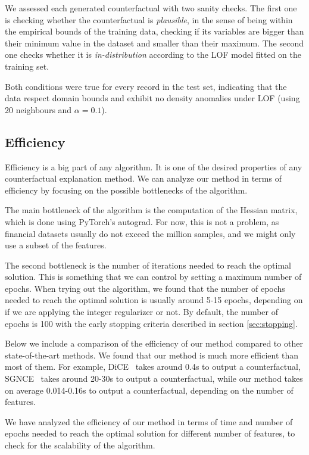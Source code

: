 \documentclass[12pt]{extarticle}
\numberwithin{equation}{section}
\begin{document}
We assessed each generated counterfactual with two sanity checks. The first one is checking whether the counterfactual is \emph{plausible}, in the sense of being within the empirical bounds of the training data, checking if its variables are bigger than their minimum value in the dataset and smaller than their maximum. The second one checks whether it is \emph{in-distribution} according to the LOF model fitted on the training set.

Both conditions were true for every record in the test set, indicating that the data respect domain bounds and exhibit no density anomalies under LOF (using 20 neighbours and $\alpha = 0.1$).

\subsection{Efficiency}\label{sec:efficiency}
Efficiency is a big part of any algorithm. It is one of the desired properties of any counterfactual explanation method. We can analyze our method in terms of efficiency by focusing on the possible bottlenecks of the algorithm. 

The main bottleneck of the algorithm is the computation of the Hessian matrix, which is done using PyTorch's autograd. For now, this is not a problem, as financial datasets usually do not exceed the million samples, and we might only use a subset of the features. 

The second bottleneck is the number of iterations needed to reach the optimal solution. This is something that we can control by setting a maximum number of epochs. When trying out the algorithm, we found that the number of epochs needed to reach the optimal solution is usually around 5-15 epochs, depending on if we are applying the integer regularizer or not. By default, the number of epochs is 100 with the early stopping criteria described in section \ref{sec:stopping}.

Below we include a comparison of the efficiency of our method compared to other state-of-the-art methods. We found that our method is much more efficient than most of them. For example, DiCE~\cite{dice} takes around 0.4s to output a counterfactual, SGNCE~\cite{sgnce} takes around 20-30s to output a counterfactual, while our method takes on average 0.014-0.16s to output a counterfactual, depending on the number of features. 

We have analyzed the efficiency of our method in terms of time and number of epochs needed to reach the optimal solution for different number of features, to check for the scalability of the algorithm.
\end{document}
